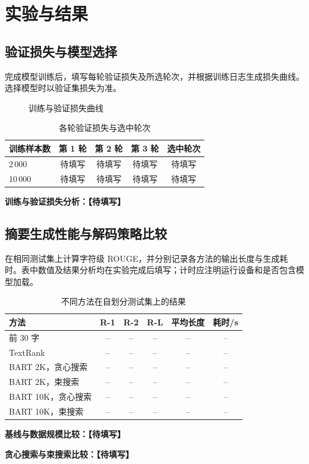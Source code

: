 \documentclass{sdxxpaper}
\begin{document}
\section{实验与结果}
\subsection{验证损失与模型选择}
完成模型训练后，填写每轮验证损失及所选轮次，并根据训练日志生成损失曲线。选择模型时以验证集损失为准。
\begin{figure}[htbp]
\centering{}
\caption{训练与验证损失曲线}\label{fig:loss}
\end{figure}
\begin{table}[htbp]
\centering\caption{各轮验证损失与选中轮次}\label{tab:loss}
\renewcommand{\arraystretch}{1.2}
\begin{tabular}{lcccc}\toprule
训练样本数 & 第 1 轮 & 第 2 轮 & 第 3 轮 & 选中轮次\\\midrule
2\,000 & 待填写 & 待填写 & 待填写 & 待填写\\
10\,000 & 待填写 & 待填写 & 待填写 & 待填写\\\bottomrule
\end{tabular}
\end{table}
\noindent\textbf{训练与验证损失分析：【待填写】}

\subsection{摘要生成性能与解码策略比较}
在相同测试集上计算字符级 ROUGE，并分别记录各方法的输出长度与生成耗时。表中数值及结果分析均在实验完成后填写；计时应注明运行设备和是否包含模型加载。
\begin{table}[htbp]
\centering\caption{不同方法在自划分测试集上的结果}\label{tab:results}
\renewcommand{\arraystretch}{1.2}
\begin{tabular}{lccccc}\toprule
方法 & R-1 & R-2 & R-L & 平均长度 & 耗时/s\\\midrule
前 30 字 & -- & -- & -- & -- & --\\
TextRank & -- & -- & -- & -- & --\\
BART 2K，贪心搜索 & -- & -- & -- & -- & --\\
BART 2K，束搜索 & -- & -- & -- & -- & --\\
BART 10K，贪心搜索 & -- & -- & -- & -- & --\\
BART 10K，束搜索 & -- & -- & -- & -- & --\\\bottomrule
\end{tabular}
\end{table}
\noindent\textbf{基线与数据规模比较：【待填写】}\par
\noindent\textbf{贪心搜索与束搜索比较：【待填写】}
\end{document}
